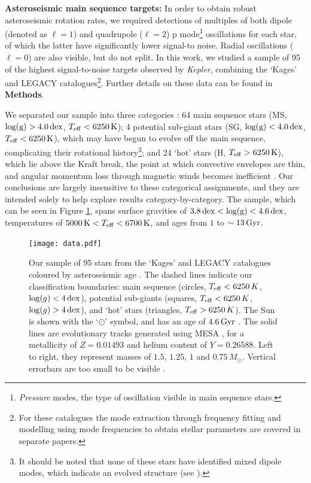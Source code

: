 \documentclass[12pt]{article}
\newcommand{\teff}{\mbox{$T_{\rm eff}$}\xspace}
\newcommand{\logg}{\mbox{$\log(g)$}\xspace}
\begin{document}
\textbf{Asteroseismic main sequence targets:} In order to obtain robust asteroseismic rotation rates, we required detections of multiples of both dipole (denoted as $\ell = 1$) and quadrupole ($\ell = 2$) p mode\footnote{\textit{Pressure} modes, the type of oscillation visible in main sequence stars.} oscillations for each star, of which the latter have significantly lower signal-to noise. Radial oscillations ($\ell = 0$) are also visible, but do not split. In this work, we studied a sample of 95 of the highest signal-to-noise targets observed by \textit{Kepler}, combining the `Kages' \cite{silvaaguirre+2015,davies+2016} and LEGACY \cite{lund+2017, silvaaguirre+2017} catalogues\footnote{For these catalogues the mode extraction through frequency fitting \cite{davies+2016, lund+2017} and modelling using mode frequencies to obtain stellar parameters \cite{silvaaguirre+2015, silvaaguirre+2017} are covered in separate papers.}. Further details on these data can be found in \textbf{Methods}. 

We separated our sample into three categories \cite{garcia+2014}: 64 main sequence stars (MS, $\rm{log(g)} > 4.0\, \rm dex$, $T_{\rm eff} < 6250\, \rm K$); 4 potential sub-giant stars (SG, $\rm{log(g)} < 4.0\, \rm dex$, $T_{\rm eff} < 6250\, \rm K$), which may have begun to evolve off the main sequence, complicating their rotational history\footnote{It should be noted that none of these stars have identified mixed dipole modes, which indicate an evolved structure (see \cite{bedding+2010}).}; and 24 `hot' stars (H, $T_{\rm eff} > 6250\, \rm K$), which lie above the Kraft break, the point at which convective envelopes are thin, and angular momentum loss through magnetic winds becomes inefficient \cite{kraft1967}. Our conclusions are largely insensitive to these categorical assignments, and they are intended solely to help explore results category-by-category. The sample, which can be seen in Figure \ref{fig:sample}, spans surface gravities of $3.8\, \rm{dex} < \rm{log(g)} < 4.6\, \rm{dex}$, temperatures of $5000\, \textrm{K} < T_{\rm eff} <  6700\, \rm{K}$, and ages from $1$ to $\sim 13\, \rm{Gyr}$.\\

\begin{figure}[h!]
	\centering
	\texttt{[image: data.pdf]}
	\caption{Our sample of 95 stars from the `Kages' and LEGACY catalogues coloured by asteroseismic age  \cite{silvaaguirre+2015, silvaaguirre+2017}. The dashed lines indicate our classification boundaries: main sequence (circles, $\teff < 6250\, K$, $\logg < 4\, \rm{dex}$), potential sub-giants (squares, $\teff < 6250\, K$, $\logg > 4\, \rm{dex}$), and `hot' stars (triangles, $\teff > 6250\, K$). The Sun is shown with the `$\odot$' symbol, and has an age of $4.6\, \rm{Gyr}$ \cite{bonanno+frohlich2015}. The solid lines are evolutionary tracks generated using MESA \cite{paxton+2017}, for a metallicity of $Z = 0.01493$ and helium content of $Y = 0.26588$. Left to right, they represent masses of $1.5$, $1.25$, $1$ and $0.75\, M_\odot$. Vertical errorbars are too small to be visible \cite{hunter2007}.}
	\label{fig:sample}
\end{figure}
\end{document}
